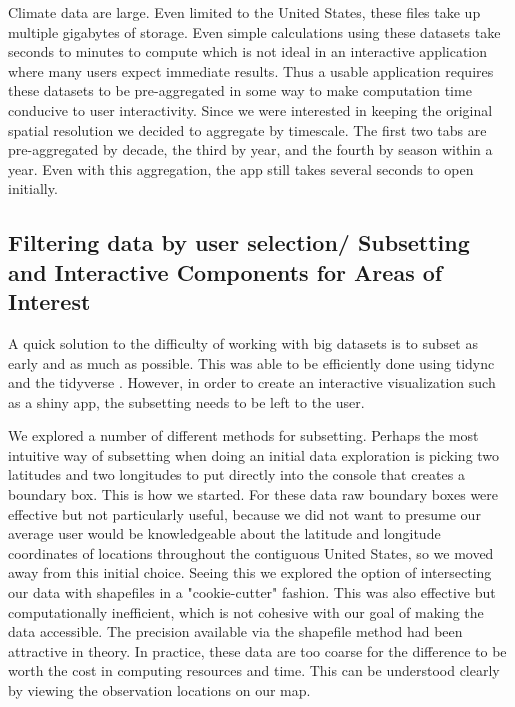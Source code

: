 \documentclass[10pt,letterpaper]{article}
\begin{document}
Climate data are large. Even limited to the United States, these files take up multiple gigabytes of storage. Even simple calculations using these datasets take seconds to minutes to compute which is not ideal in an interactive application where many users expect immediate results. Thus a usable application requires these datasets to be pre-aggregated in some way to make computation time conducive to user interactivity. Since we were interested in keeping the original spatial resolution we decided to aggregate by timescale. The first two tabs are pre-aggregated by decade, the third by year, and the fourth by season within a year. Even with this aggregation, the app still takes several seconds to open initially.


\subsection*{Filtering data by user selection/ Subsetting and Interactive Components for Areas of Interest}

A quick solution to the difficulty of working with big datasets is to subset as early and as much as possible. This was able to be efficiently done using tidync\cite{tidync} and the tidyverse\cite{tidyverse} . However, in order to create an interactive visualization such as a shiny app, the subsetting needs to be left to the user.

We explored a number of different methods for subsetting. Perhaps the most intuitive way of subsetting when doing an initial data exploration is picking two latitudes and two longitudes to put directly into the console that creates a boundary box. This is how we started. For these data raw boundary boxes were effective but not particularly useful, because we did not want to presume our average user would be knowledgeable about the latitude and longitude coordinates of locations throughout the contiguous United States, so we moved away from this initial choice. Seeing this we explored the option of intersecting our data with shapefiles in a "cookie-cutter" fashion. This was also effective but computationally inefficient, which is not cohesive with our goal of making the data accessible. The precision available via the shapefile method had been attractive in theory. In practice, these data are too coarse for the difference to be worth the cost in computing resources and time. This can be understood clearly by viewing the observation locations on our map.
\end{document}
